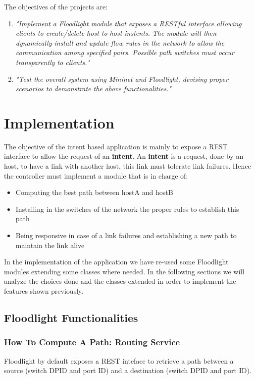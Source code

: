 \documentclass[a4paper]{report}
\begin{document}
	
	\noindent The objectives of the projects are:
	\begin{enumerate}
		\item \textit{"Implement a Floodlight module that exposes a RESTful interface allowing clients to create/delete host-to-host instents. The module will then dynamically install and update flow rules in the network to allow the communication among specified pairs. Possible path switches must occur transparently to clients."}
		
		\item \textit{"Test the overall system using Mininet and Floodlight, devising proper scenarios to demonstrate the above functionalities."}
	\end{enumerate}
	
	
	\chapter{Implementation}
	\noindent The objective of the intent based application is mainly to expose a REST interface to allow the request of an \textbf{intent}. An \textbf{intent} is a request, done by an host, to have a link with another host, this link must tolerate link failures.
	\noindent Hence the controller must implement a module that is in charge of:
	\begin{itemize}
		\item Computing the best path between hostA and hostB
		\item Installing in the switches of the network the proper rules to establish this path
		\item Being responsive in case of a link failures and establishing a new path to maintain the link alive
	\end{itemize}
	\noindent In the implementation of the application we have re-used some Floodlight modules extending some classes where needed. In the following sections we will analyze the choices done and the classes extended in order to implement the features shown previously.
	
	\section{Floodlight Functionalities}
	\subsection{How To Compute A Path: Routing Service}
	\noindent Floodlight by default exposes a REST inteface to retrieve a path between a source (switch DPID and port ID) and a destination (switch DPID and port ID).
	
\end{document}
